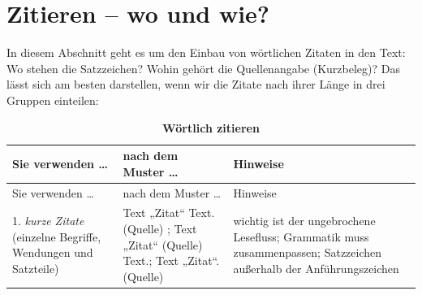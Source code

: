 \documentclass[]{book}
\theoremstyle{definition}
\theoremstyle{definition}
\theoremstyle{definition}
\theoremstyle{remark}
\begin{document}
\section{Zitieren -- wo und wie?}\label{zitieren-wo-und-wie}

In diesem Abschnitt geht es um den Einbau von wörtlichen Zitaten in den
Text: Wo stehen die Satzzeichen? Wohin gehört die Quellenangabe
(Kurzbeleg)? Das lässt sich am besten darstellen, wenn wir die Zitate
nach ihrer Länge in drei Gruppen einteilen:

\begin{longtable}[]{@{}lll@{}}
\caption{\textbf{\label{tab:zitieren2} Wörtlich zitieren}}\tabularnewline
\toprule
\begin{minipage}[b]{0.25\columnwidth}\raggedright\strut
Sie verwenden \ldots{}\strut
\end{minipage} & \begin{minipage}[b]{0.34\columnwidth}\raggedright\strut
nach dem Muster \ldots{}\strut
\end{minipage} & \begin{minipage}[b]{0.32\columnwidth}\raggedright\strut
Hinweise\strut
\end{minipage}\tabularnewline
\midrule
\endfirsthead
\toprule
\begin{minipage}[b]{0.25\columnwidth}\raggedright\strut
Sie verwenden \ldots{}\strut
\end{minipage} & \begin{minipage}[b]{0.34\columnwidth}\raggedright\strut
nach dem Muster \ldots{}\strut
\end{minipage} & \begin{minipage}[b]{0.32\columnwidth}\raggedright\strut
Hinweise\strut
\end{minipage}\tabularnewline
\midrule
\endhead
\begin{minipage}[t]{0.25\columnwidth}\raggedright\strut
1. \emph{kurze Zitate} (einzelne Begriffe, Wendungen und
Satzteile)\strut
\end{minipage} & \begin{minipage}[t]{0.34\columnwidth}\raggedright\strut
Text „Zitat`` Text. (Quelle) ; Text „Zitat`` (Quelle) Text.; Text
„Zitat``. (Quelle)\strut
\end{minipage} & \begin{minipage}[t]{0.32\columnwidth}\raggedright\strut
wichtig ist der ungebrochene Lesefluss; Grammatik muss zusammenpassen;
Satzzeichen außerhalb der Anführungszeichen \vspace{-6mm}\strut
\end{minipage}\tabularnewline

\end{longtable}
\end{document}
